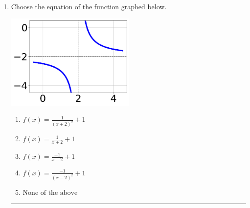 \documentclass[14pt]{extbook}
\newcommand{\litem}[1]{\item#1\hspace*{-1cm}\rule{\textwidth}{0.4pt}}
\begin{document}
\begin{enumerate}
{\begin{enumerate}[label=\Alph*.]
\end{enumerate} }
\litem{
Choose the equation of the function graphed below.
\begin{center}
    \includegraphics[width=0.5\textwidth]{../Figures/rationalGraphToEquationC.png}
\end{center}
\begin{enumerate}[label=\Alph*.]
\item \( f(x) = \frac{1}{(x + 2)^2} + 1 \)
\item \( f(x) = \frac{1}{x + 2} + 1 \)
\item \( f(x) = \frac{-1}{x - 2} + 1 \)
\item \( f(x) = \frac{-1}{(x - 2)^2} + 1 \)
\item \( \text{None of the above} \)

\end{enumerate} }
\end{enumerate}
\end{document}
